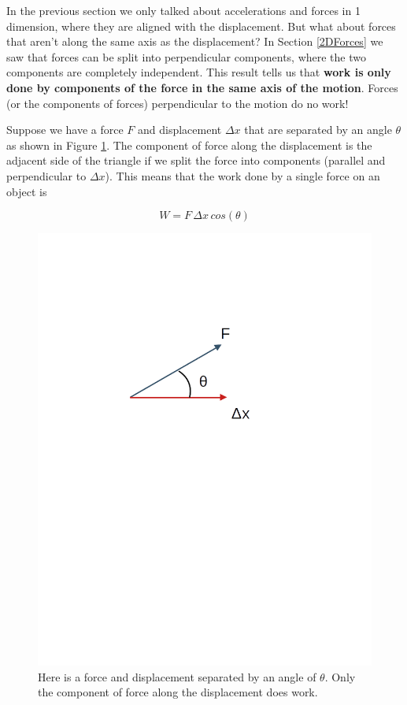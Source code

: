 \documentclass[12pt]{book}
\begin{document}
In the previous section we only talked about accelerations and forces in 1 dimension, where they are aligned with the displacement. But what about forces that aren't along the same axis as the displacement? In Section \ref{2DForces} we saw that forces can be split into perpendicular components, where the two components are completely independent. This result tells us that \textbf{work is only done by components of the force in the same axis of the motion}. Forces (or the components of forces) perpendicular to the motion do no work!



Suppose we have a force $F$ and displacement $\Delta x$ that are separated by an angle $\theta$ as shown in Figure \ref{work_angle}. The component of force along the displacement is the adjacent side of the triangle if we split the force into components (parallel and perpendicular to $\Delta x$). This means that the work done by a single force on an object is

\begin{equation}
W = F \, \Delta x \, cos(\theta)
\label{workdef}
\end{equation}

\begin{figure}[H]
\centering
\includegraphics[scale=0.5]{work_angle.png}
\caption{Here is a force and displacement separated by an angle of $\theta$. Only the component of force along the displacement does work.}
\label{work_angle}
\end{figure}
\end{document}
